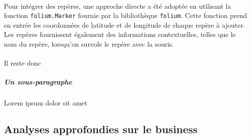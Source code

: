 \paragraph{}
\vspace{-2em}
Pour intégrer des repères, une approche directe a été adoptée en utilisant la fonction \texttt{folium.Marker} fournie par la bibliothèque \texttt{folium}. Cette fonction prend en entrée les coordonnées de latitude et de longitude de chaque repère à ajouter. Les repères fournissent également des informations contextuelles, telles que le nom du repère, lorsqu'on survole le repère avec la souris.
\paragraph{}
\vspace{-2em}
Il reste donc

\subparagraph{Un sous-paragraphe}
Lorem ipsum dolor sit amet

\subsection{Analyses approfondies sur le business}